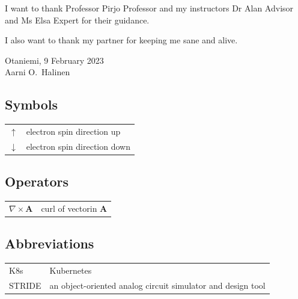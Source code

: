 \documentclass[english, 12pt, a4paper, sci, utf8, a-2b, online]{aaltothesis}
\begin{document}
\newpage

\dothesispagenumbering{}

I want to thank Professor Pirjo Professor and my instructors Dr Alan Advisor and
Ms Elsa Expert for their guidance.

I also want to thank my partner for keeping me sane and alive.

\vspace{5cm}
Otaniemi, 9 February 2023\\

\vspace{5mm}
{\hfill Aarni O.\ Halinen \hspace{1cm}}

\newpage

\thesistableofcontents


\subsection*{Symbols}

\begin{tabular}{ll}
  $\uparrow$       & electron spin direction up\\
  $\downarrow$     & electron spin direction down
\end{tabular}

\subsection*{Operators}

\begin{tabular}{ll}
  $\nabla \times \mathbf{A}$              & curl of vectorin $\mathbf{A}$\\
\end{tabular}

\subsection*{Abbreviations}

\begin{tabular}{ll}
  K8s         & Kubernetes \\
  STRIDE      & an object-oriented analog circuit simulator and design tool \\
\end{tabular}
\end{document}
